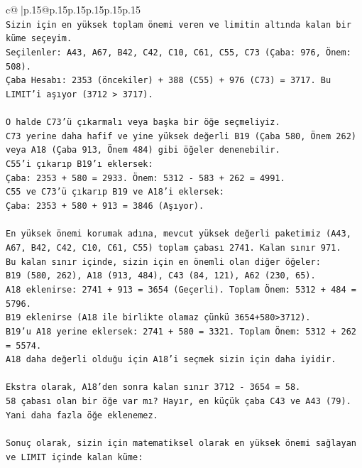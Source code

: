 \documentclass{article}
\begin{document}
{\begin{supertabular}{c@{$\;$}|p{.15\linewidth}@{}p{.15\linewidth}p{.15\linewidth}p{.15\linewidth}p{.15\linewidth}p{.15\linewidth}}
{{{\\ 
\texttt{Sizin için en yüksek toplam önemi veren ve limitin altında kalan bir küme seçeyim.} \\
\texttt{Seçilenler: A43, A67, B42, C42, C10, C61, C55, C73 (Çaba: 976, Önem: 508).} \\
\texttt{Çaba Hesabı: 2353 (öncekiler) + 388 (C55) + 976 (C73) = 3717. Bu LIMIT'i aşıyor (3712 > 3717).} \\
\\ 
\texttt{O halde C73'ü çıkarmalı veya başka bir öğe seçmeliyiz.} \\
\texttt{C73 yerine daha hafif ve yine yüksek değerli B19 (Çaba 580, Önem 262) veya A18 (Çaba 913, Önem 484) gibi öğeler denenebilir.} \\
\texttt{C55'i çıkarıp B19'ı eklersek:} \\
\texttt{Çaba: 2353 + 580 = 2933. Önem: 5312 {-} 583 + 262 = 4991.} \\
\texttt{C55 ve C73'ü çıkarıp B19 ve A18'i eklersek:} \\
\texttt{Çaba: 2353 + 580 + 913 = 3846 (Aşıyor).} \\
\\ 
\texttt{En yüksek önemi korumak adına, mevcut yüksek değerli paketimiz (A43, A67, B42, C42, C10, C61, C55) toplam çabası 2741. Kalan sınır 971.} \\
\texttt{Bu kalan sınır içinde, sizin için en önemli olan diğer öğeler:} \\
\texttt{B19 (580, 262), A18 (913, 484), C43 (84, 121), A62 (230, 65).} \\
\texttt{A18 eklenirse: 2741 + 913 = 3654 (Geçerli). Toplam Önem: 5312 + 484 = 5796.} \\
\texttt{B19 eklenirse (A18 ile birlikte olamaz çünkü 3654+580>3712).} \\
\texttt{B19'u A18 yerine eklersek: 2741 + 580 = 3321. Toplam Önem: 5312 + 262 = 5574.} \\
\texttt{A18 daha değerli olduğu için A18'i seçmek sizin için daha iyidir.} \\
\\ 
\texttt{Ekstra olarak, A18'den sonra kalan sınır 3712 {-} 3654 = 58.} \\
\texttt{58 çabası olan bir öğe var mı? Hayır, en küçük çaba C43 ve A43 (79). Yani daha fazla öğe eklenemez.} \\
\\ 
\texttt{Sonuç olarak, sizin için matematiksel olarak en yüksek önemi sağlayan ve LIMIT içinde kalan küme:} \\
}}}
\end{supertabular}}
\end{document}
